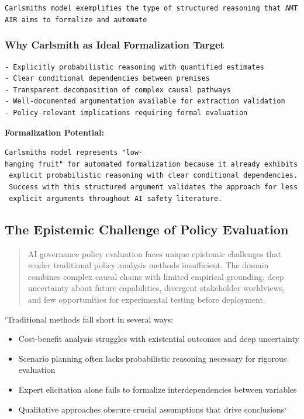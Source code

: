 \documentclass[
  11pt,
  letterpaper,
]{book}
\providecommand{\tightlist}{%
  \setlength{\itemsep}{0pt}\setlength{\parskip}{0pt}}
\begin{document}
\texttt{Carlsmith\textquotesingle{}s\ model\ exemplifies\ the\ type\ of\ structured\ reasoning\ that\ AMTAIR\ aims\ to\ formalize\ and\ automate}

\subsubsection{Why Carlsmith as Ideal Formalization
Target}\label{sec-carlsmith-ideal}

\begin{verbatim}
- Explicitly probabilistic reasoning with quantified estimates
- Clear conditional dependencies between premises  
- Transparent decomposition of complex causal pathways
- Well-documented argumentation available for extraction validation
- Policy-relevant implications requiring formal evaluation
\end{verbatim}

\textbf{Formalization Potential:}

\texttt{Carlsmith\textquotesingle{}s\ model\ represents\ "low-hanging\ fruit"\ for\ automated\ formalization\ because\ it\ already\ exhibits\ explicit\ probabilistic\ reasoning\ with\ clear\ conditional\ dependencies.\ Success\ with\ this\ structured\ argument\ validates\ the\ approach\ for\ less\ explicit\ arguments\ throughout\ AI\ safety\ literature.}

\subsection{The Epistemic Challenge of Policy
Evaluation}\label{sec-epistemic-challenge}

\begin{quote}
AI governance policy evaluation faces unique epistemic challenges that
render traditional policy analysis methods insufficient. The domain
combines complex causal chains with limited empirical grounding, deep
uncertainty about future capabilities, divergent stakeholder worldviews,
and few opportunities for experimental testing before deployment.
\end{quote}

`Traditional methods fall short in several ways:

\begin{itemize}
\tightlist
\item
  Cost-benefit analysis struggles with existential outcomes and deep
  uncertainty
\item
  Scenario planning often lacks probabilistic reasoning necessary for
  rigorous evaluation
\item
  Expert elicitation alone fails to formalize interdependencies between
  variables
\item
  Qualitative approaches obscure crucial assumptions that drive
  conclusions`
\end{itemize}
\end{document}

